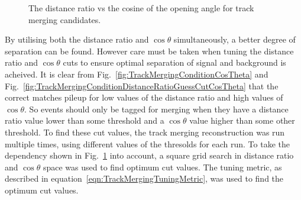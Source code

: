 \begin{figure}
  \centering
  \caption{The distance ratio vs the cosine of the opening angle for track merging candidates.}
  \label{fig:TrackMergingConditionDistanceRatioVsCosTheta}
\end{figure}
\newline
\newline
By utilising both the distance ratio and $\cos\theta$ simultaneously, a better degree of separation can be found.  However care must be taken when tuning the distance ratio and $\cos\theta$ cuts to ensure optimal separation of signal and background is acheived.  It is clear from Fig.~\ref{fig:TrackMergingConditionCosTheta} and Fig.~\ref{fig:TrackMergingConditionDistanceRatioGuessCutCosTheta} that the correct matches pileup for low values of the distance ratio and high values of $\cos\theta$.  So events should only be tagged for merging when they have a distance ratio value lower than some threshold and a $\cos\theta$ value higher than some other threshold. To find these cut values, the track merging reconstruction was run multiple times, using different values of the thresolds for each run.  To take the dependency shown in Fig.~\ref{fig:TrackMergingConditionDistanceRatioVsCosTheta} into account, a square grid search in distance ratio and $\cos\theta$ space was used to find optimum cut values.  The tuning metric, as described in equation~\ref{eqn:TrackMergingTuningMetric}, was used to find the optimum cut values.
